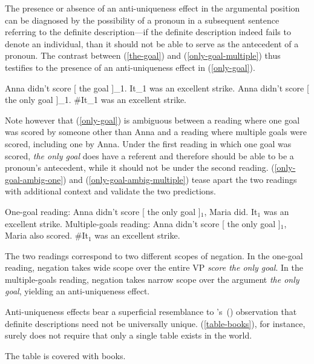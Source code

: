 \documentclass{article}
\newcommand{\citegen}[1]{\citeauthor{#1}'s~(\citeyear{#1})}
\begin{document}
The presence or absence of an anti-uniqueness effect in the argumental position can be diagnosed by the possibility of a pronoun in a subsequent sentence referring to the definite description---if the definite description indeed fails to denote an individual, than it should not be able to serve as the antecedent of a pronoun. The contrast between (\ref{the-goal}) and (\ref{only-goal-multiple}) thus testifies to the presence of an anti-uniqueness effect in (\ref{only-goal}).

\begin{exe}
	\ex \label{the-goal} Anna didn't score [ the goal ]_1. It_1 was an excellent strike.
	\ex \label{only-goal-multiple} Anna didn't score [ the only goal ]_1. \#It_1 was an excellent strike.
\end{exe}

Note however that (\ref{only-goal}) is ambiguous between a reading where one goal was scored by someone other than Anna and a reading where multiple goals were scored, including one by Anna. Under the first reading in which one goal was scored, \textit{the only goal} does have a referent and therefore should be able to be a pronoun's antecedent, while it should not be under the second reading. (\ref{only-goal-ambig-one}) and (\ref{only-goal-ambig-multiple}) tease apart the two readings with additional context and validate the two predictions.

\begin{exe}
	\ex \label{only-goal-ambig-one} One-goal reading: Anna didn't score [ the only goal ]$_1$, Maria did. It$_1$ was an excellent strike.
	\ex \label{only-goal-ambig-multiple} Multiple-goals reading: Anna didn't score [ the only goal ]$_1$, Maria also scored. \#It$_1$ was an excellent strike.
\end{exe}

The two readings correspond to two different scopes of negation. In the one-goal reading, negation takes wide scope over the entire VP \textit{score the only goal}. In the multiple-goals reading, negation takes narrow scope over the argument \textit{the only goal}, yielding an anti-uniqueness effect.

Anti-uniqueness effects bear a superficial resemblance to \citegen{strawson50} observation that definite descriptions need not be universally unique. (\ref{table-books}), for instance, surely does not require that only a single table exists in the world.

\begin{exe}
	\ex \label{table-books} The table is covered with books.
\end{exe}
\end{document}
